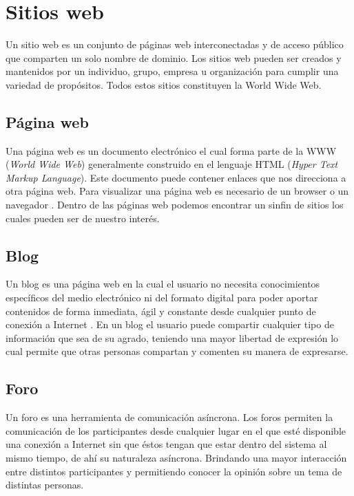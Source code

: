 \section{Sitios web}
Un sitio web \citep{CT15} es un conjunto de páginas web interconectadas y de acceso público que comparten 
un solo nombre de dominio. Los sitios web pueden ser creados y mantenidos por un individuo, grupo, empresa 
u organización para cumplir una variedad de propósitos. Todos estos sitios constituyen la World Wide Web. 

\subsection{Página web}
Una página web es un documento electrónico el cual forma parte de la WWW (\textit{World Wide Web}) generalmente 
construido en el lenguaje HTML (\textit{Hyper Text Markup Language}). Este documento puede contener enlaces que nos 
direcciona a otra página web. Para visualizar una página web es necesario de un browser o un navegador \citep{CT16}. 
Dentro de las páginas web podemos encontrar un sinfin de sitios los cuales pueden ser de nuestro interés.

\subsection{Blog}
Un blog es una página web en la cual el usuario no necesita conocimientos específicos del medio electrónico ni del 
formato digital para poder aportar contenidos de forma inmediata, ágil y constante desde cualquier punto de conexión 
a Internet \citep{CT17}. En un blog el usuario puede compartir cualquier tipo de información que sea de su agrado, 
teniendo una mayor libertad de expresión lo cual permite que otras personas compartan y comenten su manera de expresarse.

\subsection{Foro}
Un foro es una herramienta de comunicación asíncrona. Los foros permiten la comunicación de los participantes desde 
cualquier lugar en el que  esté  disponible  una  conexión  a Internet  sin  que  éstos  tengan  que  estar dentro del 
sistema al mismo tiempo, de ahí su naturaleza asíncrona. Brindando una mayor interacción entre distintos 
participantes y permitiendo conocer la opinión sobre un tema de distintas personas.


